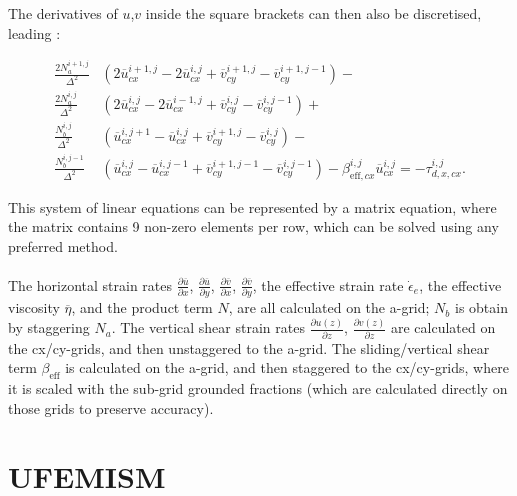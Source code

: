 \documentclass{article}
\begin{document}
The derivatives of $u$,$v$ inside the square brackets can then also be discretised, leading :

\begin{equation} \label{eq:DIVA_disc_03}
\begin{split}
\frac{ 2 N_a^{i+1,j}}{\Delta^2} & \left( 2 \overline{u}_{cx}^{i+1,j} - 2 \overline{u}_{cx}^{i,j} +
\overline{v}_{cy}^{i+1,j} - \overline{v}_{cy}^{i+1,j-1} \right) - \\
\frac{ 2 N_a^{i,j}}{\Delta^2} & \left( 2 \overline{u}_{cx}^{i,j} - 2 \overline{u}_{cx}^{i-1,j} +
\overline{v}_{cy}^{i,j} - \overline{v}_{cy}^{i,j-1} \right) + \\
\frac{ N_b^{i,j}}{\Delta^2} & \left( \overline{u}_{cx}^{i,j+1} - \overline{u}_{cx}^{i,j} +
\overline{v}_{cy}^{i+1,j} - \overline{v}_{cy}^{i,j} \right) - \\
\frac{ N_b^{i,j-1}}{\Delta^2} & \left( \overline{u}_{cx}^{i,j} - \overline{u}_{cx}^{i,j-1} +
\overline{v}_{cy}^{i+1,j-1} - \overline{v}_{cy}^{i,j-1} \right)
- \beta_{\textrm{eff},cx}^{i,j} \overline{u}_{cx}^{i,j} = -\tau_{d,x,cx}^{i,j}.
\end{split}
\end{equation}

This system of linear equations can be represented by a matrix equation, where the matrix contains 9 non-zero elements per row, which can be solved using any preferred method.\\
\\
The horizontal strain rates $\frac{\partial \overline{u}}{\partial x}$, $\frac{\partial \overline{u}}{\partial y}$, $\frac{\partial \overline{v}}{\partial x}$, $\frac{\partial \overline{v}}{\partial y}$, the effective strain rate $\dot{\epsilon}_e$, the effective viscosity $\overline{\eta}$, and the product term $N$, are all calculated on the a-grid; $N_b$ is obtain by staggering $N_a$. The vertical shear strain rates $\frac{\partial u(z)}{\partial z}$, $\frac{\partial v(z)}{\partial z}$ are calculated on the cx/cy-grids, and then unstaggered to the a-grid. The sliding/vertical shear term $\beta_{\textrm{eff}}$ is calculated on the a-grid, and then staggered to the cx/cy-grids, where it is scaled with the sub-grid grounded fractions (which are calculated directly on those grids to preserve accuracy).

\newpage
\section{UFEMISM}
\end{document}

